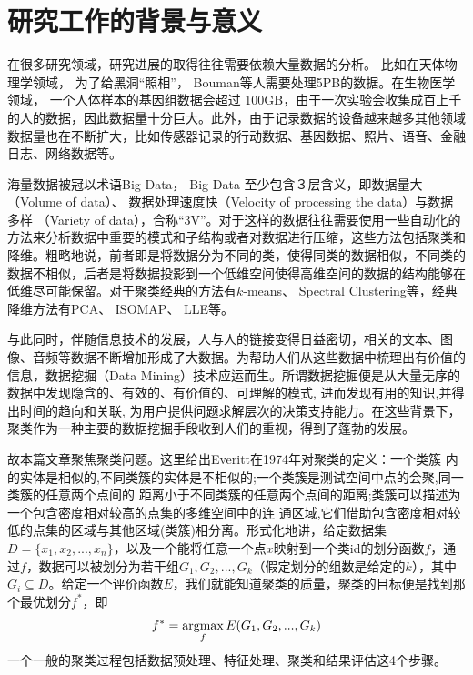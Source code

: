 \thesischapterexordium

\section{研究工作的背景与意义}

在很多研究领域，研究进展的取得往往需要依赖大量数据的分析。 比如在天体物理学领域， 为了给黑洞“照相”， Bouman等人需要处理5PB的数据。在生物医学领域， 一个人体样本的基因组数据会超过 100GB，由于一次实验会收集成百上千的人的数据，因此数据量十分巨大。此外，由于记录数据的设备越来越多其他领域数据量也在不断扩大，比如传感器记录的行动数据、基因数据、照片、语音、金融日志、网络数据等。

海量数据被冠以术语Big Data， Big Data 至少包含３层含义，即数据量大（Volume of data）、 数据处理速度快（Velocity of processing the data）与数据多样 （Variety of data），合称“3V”。对于这样的数据往往需要使用一些自动化的方法来分析数据中重要的模式和子结构或者对数据进行压缩，这些方法包括聚类和降维。粗略地说，前者即是将数据分为不同的类，使得同类的数据相似，不同类的数据不相似，后者是将数据投影到一个低维空间使得高维空间的数据的结构能够在低维尽可能保留。对于聚类经典的方法有$k$-means、 Spectral Clustering等，经典降维方法有PCA、 ISOMAP、 LLE等。

与此同时，伴随信息技术的发展，人与人的链接变得日益密切，相关的文本、图像、音频等数据不断增加形成了大数据。为帮助人们从这些数据中梳理出有价值的信息，数据挖掘（Data Mining）技术应运而生。所谓数据挖掘便是从大量无序的数据中发现隐含的、有效的、有价值的、可理解的模式, 进而发现有用的知识,并得出时间的趋向和关联, 为用户提供问题求解层次的决策支持能力。在这些背景下，聚类作为一种主要的数据挖掘手段收到人们的重视，得到了蓬勃的发展。

故本篇文章聚焦聚类问题。这里给出Everitt在1974年对聚类的定义：一个类簇
内的实体是相似的,不同类簇的实体是不相似的;一个类簇是测试空间中点的会聚,同一类簇的任意两个点间的
距离小于不同类簇的任意两个点间的距离;类簇可以描述为一个包含密度相对较高的点集的多维空间中的连
通区域,它们借助包含密度相对较低的点集的区域与其他区域(类簇)相分离。形式化地讲，给定数据集$D=\{x_1,x_2,...,x_n\}$，以及一个能将任意一个点$x$映射到一个类id的划分函数$f$，通过$f$，数据可以被划分为若干组${G_1,G_2,...,G_k}$（假定划分的组数是给定的$k$），其中$G_i \subseteq D$。给定一个评价函数$E$，我们就能知道聚类的质量，聚类的目标便是找到那个最优划分$f^*$，即
\begin{equation}
    f^* = \operatorname*{argmax}_f E(G_1,G_2,...,G_k)
\end{equation}
一个一般的聚类过程包括数据预处理、特征处理、聚类和结果评估这4个步骤。


